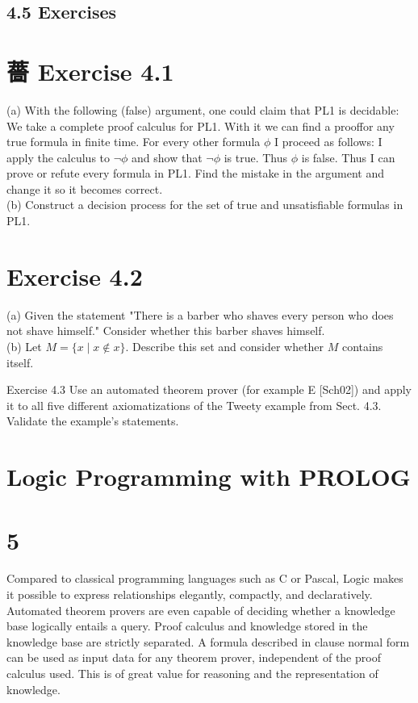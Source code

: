 \documentclass[10pt]{article}
\begin{document}
\subsection*{4.5 Exercises}
\section*{薔 Exercise 4.1}
(a) With the following (false) argument, one could claim that PL1 is decidable: We take a complete proof calculus for PL1. With it we can find a prooffor any true formula in finite time. For every other formula $\phi$ I proceed as follows: I apply the calculus to $\neg \phi$ and show that $\neg \phi$ is true. Thus $\phi$ is false. Thus I can prove or refute every formula in PL1. Find the mistake in the argument and change it so it becomes correct.\\
(b) Construct a decision process for the set of true and unsatisfiable formulas in PL1.

\section*{Exercise 4.2}
(a) Given the statement "There is a barber who shaves every person who does not shave himself." Consider whether this barber shaves himself.\\
(b) Let $M=\{x \mid x \notin x\}$. Describe this set and consider whether $M$ contains itself.

Exercise 4.3 Use an automated theorem prover (for example E [Sch02]) and apply it to all five different axiomatizations of the Tweety example from Sect. 4.3. Validate the example's statements.

\section*{Logic Programming with PROLOG}
\section*{5}
Compared to classical programming languages such as C or Pascal, Logic makes it possible to express relationships elegantly, compactly, and declaratively. Automated theorem provers are even capable of deciding whether a knowledge base logically entails a query. Proof calculus and knowledge stored in the knowledge base are strictly separated. A formula described in clause normal form can be used as input data for any theorem prover, independent of the proof calculus used. This is of great value for reasoning and the representation of knowledge.
\end{document}
